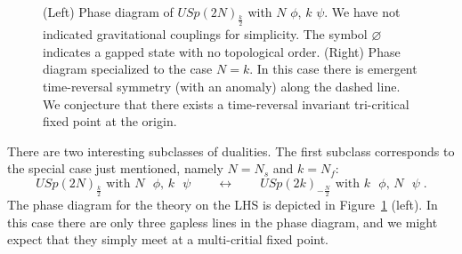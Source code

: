 \documentclass[a4paper, 12pt]{article}
\numberwithin{equation}{section}
\newcommand{\be}{\begin{equation}} \newcommand{\ee}{\end{equation}}
\begin{document}
\begin{figure}[t!]
\centering
{}
\caption{(Left) Phase diagram of $USp(2N)_{\frac k2}$ with $N$ $\phi$, $k$ $\psi$. We have not indicated gravitational couplings for simplicity. The symbol $\varnothing$ indicates a gapped state with no topological order. (Right) Phase diagram specialized to the case $N=k$. In this case there is emergent time-reversal symmetry (with an anomaly) along the dashed line. We conjecture that there exists a time-reversal invariant tri-critical fixed point at the origin.
\label{fig: USp 3 lines}}
\end{figure}

There are two interesting subclasses of dualities. The first subclass corresponds to the special case just mentioned, namely $N = N_s$ and $k = N_f$:
\be
USp(2N)_\frac k2 \text{ with $N$ $\phi$, $k$ $\psi$} \qquad\longleftrightarrow\qquad USp(2k)_{-\frac N2} \text{ with $k$ $\phi$, $N$ $\psi$} \;.
\ee
The phase diagram for the theory on the LHS is depicted in Figure~\ref{fig: USp 3 lines} (left). In this case there are only three gapless lines in the phase diagram, and we might expect that they simply meet at a multi-critial fixed point.
\end{document}
